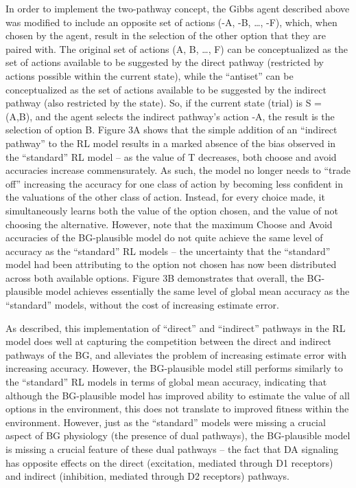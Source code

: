 \documentclass[10pt,letterpaper]{article}
\begin{document}
In order to implement the two-pathway concept, the Gibbs agent described above was modified to include an opposite set of actions (-A, -B, …, -F), which, when chosen by the agent, result in the selection of the other option that they are paired with. The original set of actions (A, B, …, F) can be conceptualized as the set of actions available to be suggested by the direct pathway (restricted by actions possible within the current state), while the “antiset” can be conceptualized as the set of actions available to be suggested by the indirect pathway (also restricted by the state). So, if the current state (trial) is S = (A,B), and the agent selects the indirect pathway’s action -A, the result is the selection of option B. Figure 3A shows that the simple addition of an “indirect pathway” to the RL model results in a marked absence of the bias observed in the “standard” RL model – as the value of T decreases, both choose and avoid accuracies increase commensurately. As such, the model no longer needs to “trade off” increasing the accuracy for one class of action by becoming less confident in the valuations of the other class of action. Instead, for every choice made, it simultaneously learns both the value of the option chosen, and the value of not choosing the alternative. However, note that the maximum Choose and Avoid accuracies of the BG-plausible model do not quite achieve the same level of accuracy as the “standard” RL models – the uncertainty that the “standard” model had been attributing to the option not chosen has now been distributed across both available options.  Figure 3B demonstrates that overall, the BG-plausible model achieves essentially the same level of global mean accuracy as the “standard” models, without the cost of increasing estimate error. 
	
As described, this implementation of “direct” and “indirect” pathways in the RL model does well at capturing the competition between the direct and indirect pathways of the BG, and alleviates the problem of increasing estimate error with increasing accuracy. However, the BG-plausible model still performs similarly to the “standard” RL models in terms of global mean accuracy, indicating that although the BG-plausible model has improved ability to estimate the value of all options in the environment, this does not translate to improved fitness within the environment. However, just as the “standard” models were missing a crucial aspect of BG physiology (the presence of dual pathways), the BG-plausible model is missing a crucial feature of these dual pathways – the fact that DA signaling has opposite effects on the direct (excitation, mediated through D1 receptors) and indirect (inhibition, mediated through D2 receptors) pathways. 
	
\end{document}
